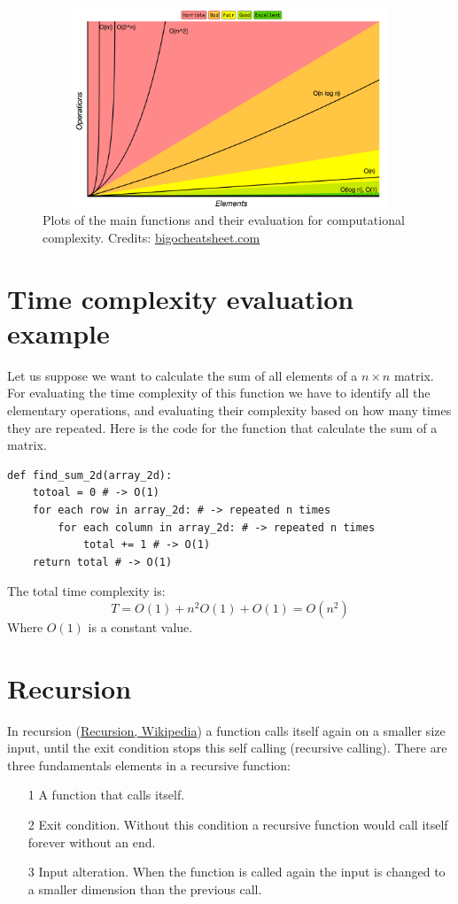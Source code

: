 \begin{figure}[hb]
	\includegraphics[width=14cm,height=6cm]{chapters/introduction/images/big_o_plots.png}
	\caption[]{Plots of the main functions and their evaluation for computational complexity. Credits: \href{https://www.bigocheatsheet.com/}{bigocheatsheet.com}}
\end{figure}

\section{Time complexity evaluation example}
Let us suppose we want to calculate the sum of all elements of a \(n\times n\) matrix. For evaluating the time complexity of this function we have to identify all the elementary operations, and evaluating their complexity based on how many times they are repeated. Here is the code for the function that calculate the sum of a matrix.

\begin{lstlisting}[caption={Sum of all elements of a matrix.}]
def find_sum_2d(array_2d):
	totoal = 0 # -> O(1)
	for each row in array_2d: # -> repeated n times
		for each column in array_2d: # -> repeated n times
			total += 1 # -> O(1)
	return total # -> O(1)
\end{lstlisting}

The total time complexity is: 
\[T = O(1) + n^{2}O(1) + O(1) = O(n^{2}) \]
Where \(O(1)\) is a constant value.

\section{Recursion}
In recursion \cite{wikirecursion} (\href{https://en.wikipedia.org/wiki/Recursion_(computer_science)}{Recursion, Wikipedia}) a function calls itself again on a smaller size input, until the exit condition stops this self calling (recursive calling). There are three fundamentals elements in a recursive function:
\begin{itemize}
\item[1] A function that calls itself.
\item[2] Exit condition. Without this condition a recursive function would call itself forever without an end.
\item[3] Input alteration. When the function is called again the input is changed to a smaller dimension than the previous call.
\end{itemize}

